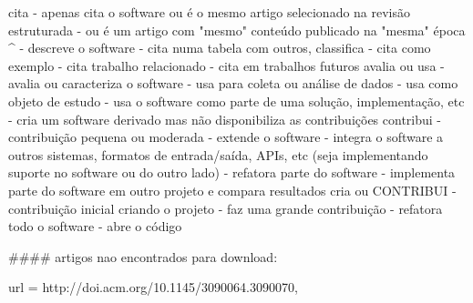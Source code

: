cita
  - apenas cita o software ou é o mesmo artigo selecionado na revisão estruturada
  - ou é um artigo com "mesmo" conteúdo publicado na "mesma" época ^
  - descreve o software
  - cita numa tabela com outros, classifica
  - cita como exemplo
  - cita trabalho relacionado
  - cita em trabalhos futuros
avalia ou usa
  - avalia ou caracteriza o software
  - usa para coleta ou análise de dados
  - usa como objeto de estudo
  - usa o software como parte de uma solução, implementação, etc
  - cria um software derivado mas não disponibiliza as contribuições
contribui
  - contribuição pequena ou moderada
  - extende o software
  - integra o software a outros sistemas, formatos de entrada/saída, APIs, etc
    (seja implementando suporte no software ou do outro lado)
  - refatora parte do software
  - implementa parte do software em outro projeto e compara resultados
cria ou CONTRIBUI
  - contribuição inicial criando o projeto
  - faz uma grande contribuição
  - refatora todo o software
  - abre o código


#### artigos nao encontrados para download:

  url = {http://doi.acm.org/10.1145/3090064.3090070},
